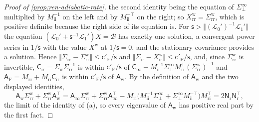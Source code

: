 \begin{proof}[Proof of \cref{prop:ren-adiabatic-rate}]
the second identity being the equation of $\Sigma^\infty_\perp$ multiplied by $M_{\mathrm{ii}}^{-1}$ on the left and by $M_{\mathrm{ii}}^{-\top}$ on the right; so $X^{\mathrm w}_{\mathrm{rr}}=\Sigma^{\mathrm w}_{\mathrm{rr}}$, which is positive definite because the right side of its equation is. For $\mathsf s>\Vert(\mathcal L_0')^{-1}\mathcal L_1'\Vert$ the equation $(\mathcal L_0'+\mathsf s^{-1}\mathcal L_1')X=\mathcal B$ has exactly one solution, a convergent power series in $1/\mathsf s$ with the value $X^{\mathrm w}$ at $1/\mathsf s=0$, and the stationary covariance provides a solution. Hence $\Vert\Sigma_{\mathrm{rr}}-\Sigma^{\mathrm w}_{\mathrm{rr}}\Vert\le\mathsf c'_{\mathrm F}/\mathsf s$ and $\Vert\Sigma_{\mathrm{ir}}-X^{\mathrm w}_{\mathrm{ir}}\Vert\le\mathsf c'_{\mathrm F}/\mathsf s$, and, since $\Sigma^{\mathrm w}_{\mathrm{rr}}$ is invertible, $\mathsf C_{\mathrm{ir}}=\Sigma_{\mathrm{ir}}\Sigma_{\mathrm{rr}}^{-1}$ is within $\mathsf c'_{\mathrm F}/\mathsf s$ of $\mathsf C_\infty-M_{\mathrm{ii}}^{-1}\Sigma^\infty_\perp M_{\mathrm{ri}}^\top(\Sigma^{\mathrm w}_{\mathrm{rr}})^{-1}$ and $\mathsf A_{\mathrm F}=M_{\mathrm{rr}}+M_{\mathrm{ri}}\mathsf C_{\mathrm{ir}}$ is within $\mathsf c'_{\mathrm F}/\mathsf s$ of $\mathsf A_{\mathrm w}$. By the definition of $\mathsf A_{\mathrm w}$ and the two displayed identities,
\[
\mathsf A_{\mathrm w}\Sigma^{\mathrm w}_{\mathrm{rr}}+\Sigma^{\mathrm w}_{\mathrm{rr}}\mathsf A_{\mathrm w}^\top=\mathsf A_\infty\Sigma^{\mathrm w}_{\mathrm{rr}}+\Sigma^{\mathrm w}_{\mathrm{rr}}\mathsf A_\infty^\top-M_{\mathrm{ri}}\bigl(M_{\mathrm{ii}}^{-1}\Sigma^\infty_\perp+\Sigma^\infty_\perp M_{\mathrm{ii}}^{-\top}\bigr)M_{\mathrm{ri}}^\top=2\mathsf N_{\mathrm r}\mathsf N_{\mathrm r}^\top,
\]
the limit of the identity of (a), so every eigenvalue of $\mathsf A_{\mathrm w}$ has positive real part by the first fact.


\end{proof}

